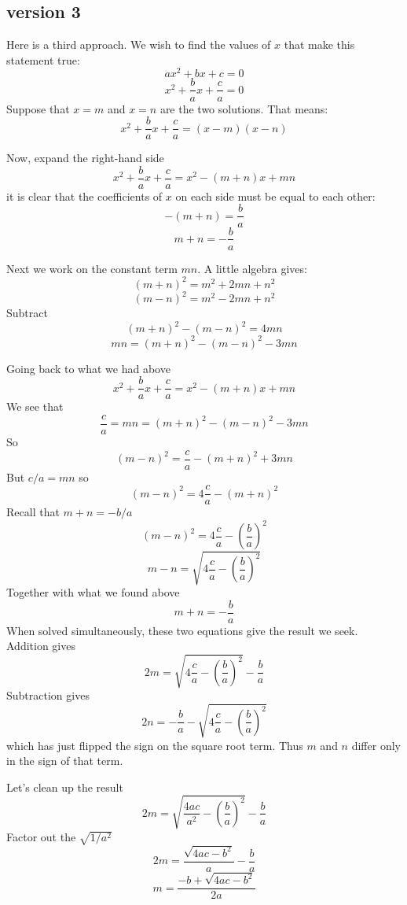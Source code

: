 \documentclass[11pt, oneside]{article}   	%
\begin{document}
\subsection*{version 3}
Here is a third approach.  We wish to find the values of $x$ that make this statement true:
\[ ax^2 + bx + c = 0 \]
\[ x^2 + \frac{b}{a} x + \frac{c}{a} = 0 \]
Suppose that $x = m$ and $x = n$ are the two solutions.  That means:
\[ x^2 + \frac{b}{a} x + \frac{c}{a} = (x - m)(x-n) \]

Now, expand the right-hand side
\[ x^2 + \frac{b}{a} x + \frac{c}{a} = x^2 - (m + n)x + mn \]
it is clear that the coefficients of $x$ on each side must be equal to each other:
\[ -(m+n) = \frac{b}{a} \]
\[ m+n = -\frac{b}{a} \]

Next we work on the constant term $mn$.  A little algebra gives:
\[ (m+n)^2 = m^2 + 2mn + n^2 \]
\[ (m-n)^2 = m^2 - 2mn + n^2 \]
Subtract
\[ (m+n)^2 - (m-n)^2 = 4mn \]
\[ mn = (m+n)^2 - (m-n)^2 - 3 mn \]

Going back to what we had above
\[ x^2 + \frac{b}{a} x + \frac{c}{a} = x^2 - (m + n)x + mn \]
We see that
\[ \frac{c}{a} =  mn = (m+n)^2 - (m-n)^2 - 3 mn \]
So
\[ (m - n)^2 = \frac{c}{a} - (m+n)^2 + 3mn \]
But $c/a = mn$ so
\[ (m - n)^2 = 4\frac{c}{a} - (m+n)^2 \]
Recall that $m+n = -b/a$
\[ (m - n)^2 = 4\frac{c}{a} - (\frac{b}{a})^2 \]
\[ m - n = \sqrt{4\frac{c}{a} - (\frac{b}{a})^2} \]
Together with what we found above
\[ m + n = -\frac{b}{a} \]
When solved simultaneously, these two equations give the result we seek.  Addition gives
\[ 2m = \sqrt{4\frac{c}{a} - (\frac{b}{a})^2} -\frac{b}{a} \]
Subtraction gives
\[ 2n = -\frac{b}{a} - \sqrt{4\frac{c}{a} - (\frac{b}{a})^2} \]
which has just flipped the sign on the square root term.  Thus $m$ and $n$ differ only in the sign of that term.

Let's clean up the result
\[ 2m = \sqrt{\frac{4ac}{a^2} - (\frac{b}{a})^2} -\frac{b}{a} \]
Factor out the $\sqrt{1/a^2}$
\[ 2m = \frac{\sqrt{4ac - b^2}}{a} -\frac{b}{a} \]
\[ m = \frac{-b + \sqrt{4ac - b^2}}{2a} \]
\end{document}
